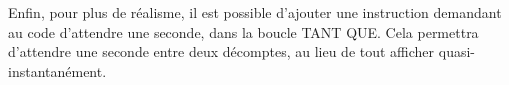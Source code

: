 \documentclass[letterpaper,10pt,french]{sphinxmanual}
\begin{document}
%
\begin{sphinxVerbatim}[commandchars=\\\{\}]
   
      
      
  
   
      
      
  
\end{sphinxVerbatim}

Enfin, pour plus de réalisme, il est possible d’ajouter une instruction demandant au code d’attendre une seconde, dans la boucle TANT QUE. Cela permettra d’attendre une seconde entre deux décomptes, au lieu de tout afficher quasi-instantanément.



\renewcommand{\indexname}{Index}
\printindex
\end{document}
